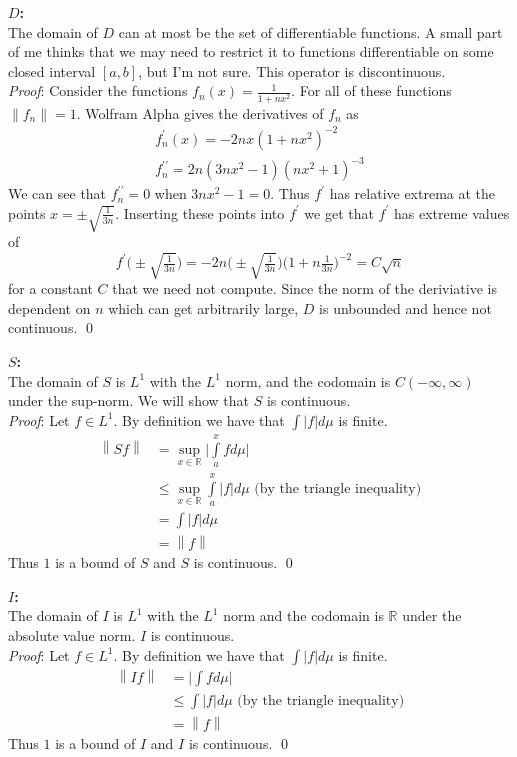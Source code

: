 \documentclass[12pt]{article}
\newcommand{\norm}[1]{\left\lVert#1\right\rVert}
\renewenvironment{proof}{\hspace{-4 ex} \emph{Proof}:}{\qed}
\newcommand{\RR}{\mathbb{R}}
\begin{document}
	\textbf{$D$:}\\
	The domain of $D$ can at most be the set of differentiable functions. A small part of me thinks that we may need to restrict it to functions differentiable on some closed interval $[a,b]$, but I'm not sure. This operator is discontinuous. \\
	\begin{proof}
		Consider the functions $f_n(x) = \frac{1}{1+nx^2}$. For all of these functions $\norm{f_n} = 1$. Wolfram Alpha gives the derivatives of $f_n$ as 
		\begin{align*}
			f_n^\prime(x) = -2nx(1+nx^2)^{-2} \\
			f_n^{\prime\prime} = 2n(3nx^2-1)(nx^2+1)^{-3}
		\end{align*} 
		We can see that $f_n^{\prime\prime} = 0$ when $3nx^2-1 = 0$. Thus $f^\prime$ has relative extrema at the points $x = \pm \sqrt{\frac{1}{3n}}$. Inserting these points into $f^\prime$ we get that $f^\prime$ has extreme values of
		$$
		f^\prime \Big(\pm \sqrt{\tfrac{1}{3n}} \Big) = -2n \Big(\pm \sqrt{\tfrac{1}{3n}} \Big) \Big(1+n\tfrac{1}{3n} \Big)^{-2} = C\sqrt{n}
		$$
		for a constant $C$ that we need not compute. Since the norm of the deriviative is dependent on $n$ which can get arbitrarily large, $D$ is unbounded and hence not continuous.
	\end{proof}
	\bigbreak
	
	\textbf{$S$:} \\
	The domain of $S$ is $L^1$ with the $L^1$ norm, and the codomain is $C(-\infty,\infty)$ under the sup-norm. We will show that $S$ is continuous.\\
	\begin{proof}
		Let $f \in L^1$. By definition we have that $\int \vert f \vert d\mu$ is finite. 
		\begin{align*}
			\norm{Sf} & = \sup\limits_{x \in \RR} \Bigg \vert \int\limits_a^x f d\mu \Bigg \vert \\
			& \leq \sup\limits_{x \in \RR} \int\limits_a^x \vert f \vert d\mu \text{ \ \ \ (by the triangle inequality)} \\
			& = \int \vert f \vert d\mu \\
			& = \norm{f}
		\end{align*}
		Thus $1$ is a bound of $S$ and $S$ is continuous.
	\end{proof} \bigbreak
	
	\textbf{$I$:} \\
	The domain of $I$ is $L^1$ with the $L^1$ norm and the codomain is $\RR$ under the absolute value norm. $I$ is continuous. \\
	\begin{proof}
		Let $f \in L^1$. By definition we have that $\int \vert f \vert d\mu$ is finite. 
		\begin{align*}
		\norm{If} & = \Bigg \vert \int f d\mu \Bigg \vert \\
		& \leq \int \vert f \vert d\mu \text{\ \ \ (by the triangle inequality)} \\
		& = \norm{f}
		\end{align*}
		Thus $1$ is a bound of $I$ and $I$ is continuous.
	\end{proof}
\end{document}
